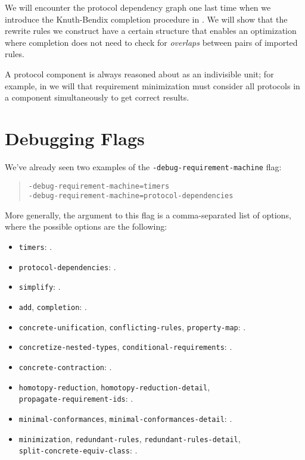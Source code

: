 \documentclass[../generics]{subfiles}
\begin{document}
We will encounter the protocol dependency graph one last time when we introduce the Knuth-Bendix completion procedure in . We will show that the rewrite rules we construct have a certain structure that enables an optimization where completion does not need to check for \emph{overlaps} between pairs of imported rules.

A protocol component is always reasoned about as an indivisible unit; for example, in  we will that requirement minimization must consider all protocols in a component simultaneously to get correct results. 

\section{Debugging Flags}\label{rqm debugging flags}

We've already seen two examples of the \texttt{-debug-requirement-machine} flag:
\begin{quote}
\begin{verbatim}
-debug-requirement-machine=timers
-debug-requirement-machine=protocol-dependencies
\end{verbatim}
\end{quote}
More generally, the argument to this flag is a comma-separated list of options, where the possible options are the following:
\begin{itemize}
\item \texttt{timers}: .
\item \texttt{protocol-dependencies}: .
\item \texttt{simplify}: .
\item \texttt{add}, \texttt{completion}: .
\item \texttt{concrete-unification}, \texttt{conflicting-rules}, \texttt{property-map}: .
\item \texttt{concretize-nested-types}, \texttt{conditional-requirements}: .
\item \texttt{concrete-contraction}: .
\item \texttt{homotopy-reduction}, \texttt{homotopy-reduction-detail},\\
\texttt{propagate-requirement-ids}: .
\item \texttt{minimal-conformances}, \texttt{minimal-conformances-detail}: .
\item \texttt{minimization},  \texttt{redundant-rules}, \texttt{redundant-rules-detail},\\
\texttt{split-concrete-equiv-class}: .
\end{itemize}
\end{document}
